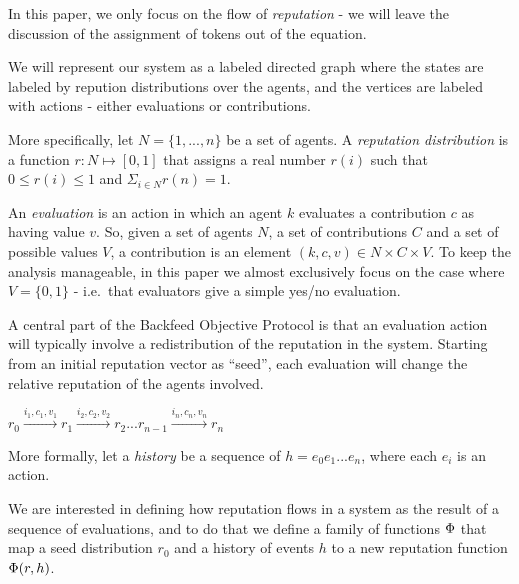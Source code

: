 \documentclass{article}
\begin{document}
In this paper, we only focus on the flow of {\em reputation}  - we will leave the discussion of the assignment of tokens out of the equation. 


We will represent our system as a labeled directed graph where the states are labeled by repution distributions over the agents, and the vertices are labeled with actions - either evaluations or contributions.

More specifically, let $N=\{1, ..., n\}$ be a set of agents. 
A {\em reputation distribution} is a function $r: N \mapsto [0,1]$ that assigns a real number $r(i)$ such that $0 \leq r(i) \leq 1$ and $\Sigma_{i \in N} r(n) = 1$. 

An {\em evaluation} is an action in which an agent $k$ evaluates a contribution $c$ as having value $v$.
So, given a set of agents $N$, a set of contributions $C$ and a set of possible values $V$, a contribution is an element $(k,c,v) \in N \times C \times V$.
To keep the analysis manageable, in this paper we almost exclusively focus on the case where $V= \{0, 1\}$ - i.e.\ that evaluators give a simple yes/no evaluation.


A central part of the Backfeed Objective Protocol is that an evaluation action will typically involve a redistribution of the reputation in the system. Starting from an initial reputation vector as ``seed'', each evaluation will change the relative reputation of the agents involved. 

\begin{center}
$r_0 \xrightarrow{i_1, c_1, v_1} r_1 \xrightarrow{i_2, c_2, v_2} r_2 ... r_{n-1} \xrightarrow{i_n, c_n, v_n} r_n$
\end{center}

More formally, let a {\em history} be a sequence of $h = e_0 e_1...  e_n$, where each $e_i$ is an action.

We are interested in defining how reputation flows in a system as the result of a sequence of evaluations, and to do that we define a family of functions $\Phi$ that map a seed distribution $r_0$ and a history of events $h$ to a new reputation function $\Phi(r, h)$. 
\end{document}
